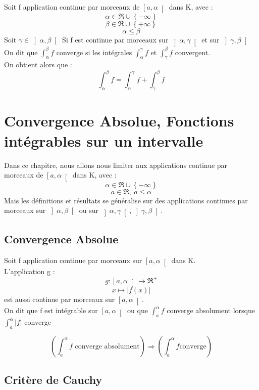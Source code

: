 \begin{prop}
Soit f application continue par morceaux de $\left[a,\alpha\right[$ dans K, avec : 
$$\alpha \in \Re\cup\left\lbrace-\infty\right\rbrace $$
$$\beta \in \Re\cup\left\lbrace+\infty\right\rbrace $$
$$\alpha \leq \beta$$
Soit $\gamma \in \left]\alpha,\beta\right[$
Si f est continue par morceaux sur $\left]\alpha,\gamma\right[$ et sur $\left]\gamma,\beta\right[$
On dit que $\int_{\alpha}^{\beta} f$ converge si les intégrales $\int_{\alpha}^{\gamma} f$ et $\int_{\gamma}^{\beta} f$ convergent.\\
On obtient alors que :
$$\int_{\alpha}^{\beta} f = \int_{\alpha}^{\gamma} f+ \int_{\gamma}^{\beta} f$$
\end{prop}
\section{Convergence Absolue, Fonctions intégrables sur un intervalle}
Dans ce chapitre, nous allons nous limiter aux applications continue par morceaux de $\left[a,\alpha\right[$ dans K, avec :
$$\alpha \in \Re\cup\left\lbrace-\infty\right\rbrace $$
$$a \in \Re,~ a \leq \alpha$$
Mais les définitions et résultats se généralise sur des applications continues par morceaux sur $\left]\alpha,\beta\right[$ ou sur $\left]\alpha,\gamma\right[,\left]\gamma,\beta\right[$.
\subsection{Convergence Absolue}
\begin{de}
Soit f application continue par morceaux sur $\left[a,\alpha\right[$ dans K.\\
L'application g :
$$g : \left[a,\alpha\right[ \rightarrow \Re^+$$
$$x \mapsto |f(x)|$$
est aussi continue par morceaux sur $\left[a,\alpha\right[$.\\
On dit que f est intégrable sur $\left[a,\alpha\right[$ ou que $\int_{a}^{\alpha} f$ converge absolument lorsque $\int_{a}^{\alpha} |f|$ converge
\end{de}
\begin{prop}
$$(\int_{a}^{\alpha} f \mbox{ converge absolument} ) \Rightarrow (\int_{a}^{\alpha} f \mbox{converge})$$
\end{prop}
\subsection{Critère de Cauchy}
